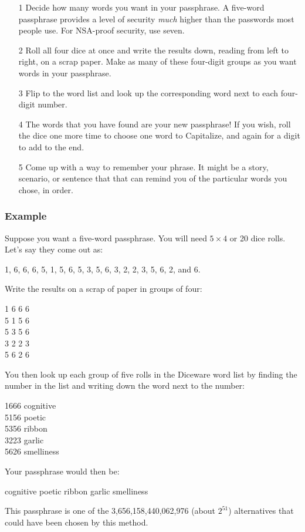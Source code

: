 \begin{itemize}[leftmargin=*]

\item[1] Decide how many words you want in your passphrase. A five-word passphrase provides a level of security \textit{much} higher than the passwords most people use. For NSA-proof security, use seven.

\item[2] Roll all four dice at once and write the results down, reading from left to right, on a scrap paper. Make as many of these four-digit groups as you want words in your passphrase.

\item[3] Flip to the word list and look up the corresponding word next to each four-digit number.

\item[4] The words that you have found are your new passphrase! If you wish, roll the dice one more time to choose one word to Capitalize, and again for a digit to add to the end.

\item[5] Come up with a way to remember your phrase. It might be a story, scenario, or sentence that that can remind you of the particular words you chose, in order.

\end{itemize}

\subsubsection*{Example}

Suppose you want a five-word passphrase. You will need $5 \times 4$ or 20 dice rolls. Let's say they come out as:

1, 6, 6, 6, 5, 1, 5, 6, 5, 3, 5, 6, 3, 2, 2, 3, 5, 6, 2, and 6. 

Write the results on a scrap of paper in groups of four:

1 6 6 6 \\
5 1 5 6 \\
5 3 5 6 \\
3 2 2 3 \\
5 6 2 6

You then look up each group of five rolls in the Diceware word list by finding the number in the list and writing down the word next to the number:

1666 cognitive \\
5156 poetic \\
5356 ribbon \\
3223 garlic \\
5626 smelliness

Your passphrase would then be:

cognitive poetic ribbon garlic smelliness

This passphrase is one of the 3,656,158,440,062,976 (about $2^{51}$) alternatives that could have been chosen by this method. 

\newpage
{}
\fontsize{7}{3mm}\selectfont
\begin{multicols}{4}
\noindent
\end{multicols}
\restoregeometry
